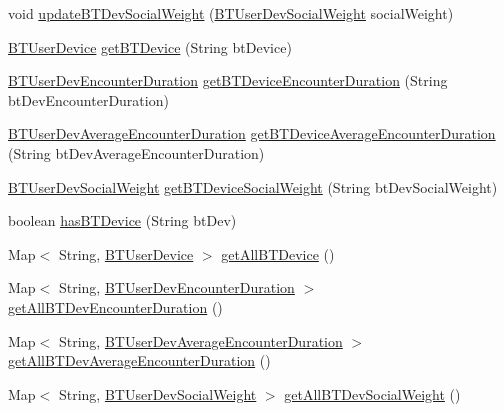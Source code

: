\begin{DoxyCompactItemize}
void \hyperlink{classcom_1_1social_1_1proximity_1_1_database_functions_abba6ca6e0149bfc752fe40748328611b}{update\+B\+T\+Dev\+Social\+Weight} (\hyperlink{classcom_1_1social_1_1proximity_1_1_b_t_user_dev_social_weight}{B\+T\+User\+Dev\+Social\+Weight} social\+Weight)
\item 
\hyperlink{classcom_1_1social_1_1proximity_1_1_b_t_user_device}{B\+T\+User\+Device} \hyperlink{classcom_1_1social_1_1proximity_1_1_database_functions_acb105b2d152bebca021902a532023f8a}{get\+B\+T\+Device} (String bt\+Device)
\item 
\hyperlink{classcom_1_1social_1_1proximity_1_1_b_t_user_dev_encounter_duration}{B\+T\+User\+Dev\+Encounter\+Duration} \hyperlink{classcom_1_1social_1_1proximity_1_1_database_functions_ac1abea0c449b91b3a7cef0d435dd380d}{get\+B\+T\+Device\+Encounter\+Duration} (String bt\+Dev\+Encounter\+Duration)
\item 
\hyperlink{classcom_1_1social_1_1proximity_1_1_b_t_user_dev_average_encounter_duration}{B\+T\+User\+Dev\+Average\+Encounter\+Duration} \hyperlink{classcom_1_1social_1_1proximity_1_1_database_functions_a1560c9dea6ddc6d0723bc94dcf239d88}{get\+B\+T\+Device\+Average\+Encounter\+Duration} (String bt\+Dev\+Average\+Encounter\+Duration)
\item 
\hyperlink{classcom_1_1social_1_1proximity_1_1_b_t_user_dev_social_weight}{B\+T\+User\+Dev\+Social\+Weight} \hyperlink{classcom_1_1social_1_1proximity_1_1_database_functions_aec10373c2ee3c4cbb74df29e1bfd3ba4}{get\+B\+T\+Device\+Social\+Weight} (String bt\+Dev\+Social\+Weight)
\item 
boolean \hyperlink{classcom_1_1social_1_1proximity_1_1_database_functions_a79227cf1e1fccd36b772389bf41bc84c}{has\+B\+T\+Device} (String bt\+Dev)
\item 
Map$<$ String, \hyperlink{classcom_1_1social_1_1proximity_1_1_b_t_user_device}{B\+T\+User\+Device} $>$ \hyperlink{classcom_1_1social_1_1proximity_1_1_database_functions_a4e1682f27d7730266f9b2a7a8fc49973}{get\+All\+B\+T\+Device} ()
\item 
Map$<$ String, \hyperlink{classcom_1_1social_1_1proximity_1_1_b_t_user_dev_encounter_duration}{B\+T\+User\+Dev\+Encounter\+Duration} $>$ \hyperlink{classcom_1_1social_1_1proximity_1_1_database_functions_af6d76fcca3b7f7d3e28e6f576a68d17b}{get\+All\+B\+T\+Dev\+Encounter\+Duration} ()
\item 
Map$<$ String, \hyperlink{classcom_1_1social_1_1proximity_1_1_b_t_user_dev_average_encounter_duration}{B\+T\+User\+Dev\+Average\+Encounter\+Duration} $>$ \hyperlink{classcom_1_1social_1_1proximity_1_1_database_functions_a48db6e5dea3fd9f5b14ceaa06bc94e53}{get\+All\+B\+T\+Dev\+Average\+Encounter\+Duration} ()
\item 
Map$<$ String, \hyperlink{classcom_1_1social_1_1proximity_1_1_b_t_user_dev_social_weight}{B\+T\+User\+Dev\+Social\+Weight} $>$ \hyperlink{classcom_1_1social_1_1proximity_1_1_database_functions_a44836cb8d594ac50db08048f50915af8}{get\+All\+B\+T\+Dev\+Social\+Weight} ()
\end{DoxyCompactItemize}
